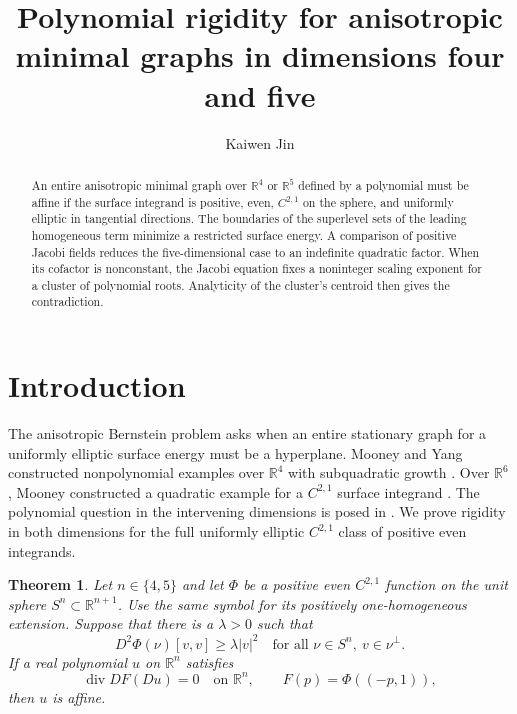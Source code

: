 \documentclass[11pt]{amsart}
\newtheorem{theorem}{Theorem}
\begin{document}
\title[Polynomial rigidity for anisotropic minimal graphs]{Polynomial rigidity for anisotropic minimal graphs in dimensions four and five}
\author{Kaiwen Jin}

\begin{abstract}
An entire anisotropic minimal graph over \(\mathbb R^4\) or \(\mathbb R^5\) defined by a polynomial must be affine if the surface integrand is positive, even, \(C^{2,1}\) on the sphere, and uniformly elliptic in tangential directions. The boundaries of the superlevel sets of the leading homogeneous term minimize a restricted surface energy. A comparison of positive Jacobi fields reduces the five-dimensional case to an indefinite quadratic factor. When its cofactor is nonconstant, the Jacobi equation fixes a noninteger scaling exponent for a cluster of polynomial roots. Analyticity of the cluster's centroid then gives the contradiction.
\end{abstract}

\maketitle

\section{Introduction}

The anisotropic Bernstein problem asks when an entire stationary graph for a uniformly elliptic surface energy must be a hyperplane. Mooney and Yang constructed nonpolynomial examples over \(\mathbb R^4\) with subquadratic growth \cite{MY}. Over \(\mathbb R^6\), Mooney constructed a quadratic example for a \(C^{2,1}\) surface integrand \cite[Theorem 1.1]{Mooney6}. The polynomial question in the intervening dimensions is posed in \cite[Section 7.2]{MooneySurvey}. We prove rigidity in both dimensions for the full uniformly elliptic \(C^{2,1}\) class of positive even integrands.

\begin{theorem}\label{thm:main}
Let \(n\in\{4,5\}\) and let \(\Phi\) be a positive even \(C^{2,1}\) function on the unit sphere \(S^n\subset\mathbb R^{n+1}\). Use the same symbol for its positively one-homogeneous extension. Suppose that there is a \(\lambda>0\) such that
\[
 D^2\Phi(\nu)[v,v]\ge \lambda |v|^2
 \quad\text{for all }\nu\in S^n,\ v\in\nu^\perp.
\]
If a real polynomial \(u\) on \(\mathbb R^n\) satisfies
\[
 \operatorname{div} DF(Du)=0\quad\text{on }\mathbb R^n,\qquad
 F(p)=\Phi((-p,1)),
\]
then \(u\) is affine.
\end{theorem}
\end{document}

